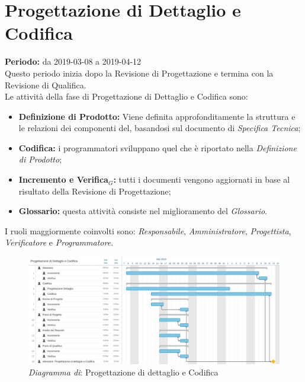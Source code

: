 \section{Progettazione di Dettaglio e Codifica}
\textbf{Periodo:} da 2019-03-08 a 2019-04-12\\
Questo periodo inizia dopo la Revisione di Progettazione e termina con la Revisione di Qualifica.\\Le attività della fase di Progettazione di Dettaglio e Codifica sono:
\begin{itemize}
    \item \textbf{Definizione di Prodotto:} Viene definita approfonditamente la struttura e le relazioni dei componenti del, basandosi sul documento di \textit{Specifica Tecnica};
    \item \textbf{Codifica:} i programmatori sviluppano quel che è riportato nella \textit{Definizione di Prodotto};
    \item \textbf{Incremento e Verifica$_{G}$:} tutti i documenti vengono aggiornati in base al risultato della Revisione di Progettazione;
    \item \textbf{Glossario:} questa attività consiste nel miglioramento del \textit{Glossario}.
\end{itemize}
I ruoli maggiormente coinvolti sono: \textit{Responsabile}, \textit{Amministratore}, \textit{Progettista}, \textit{Verificatore} e \textit{Programmatore}.
\begin{figure} [h]
    \centering
    \includegraphics[scale=0.1]{./images/codifica.jpg}
    \caption{\textit{Diagramma di}: Progettazione di dettaglio e Codifica }\label{}
\end{figure}
